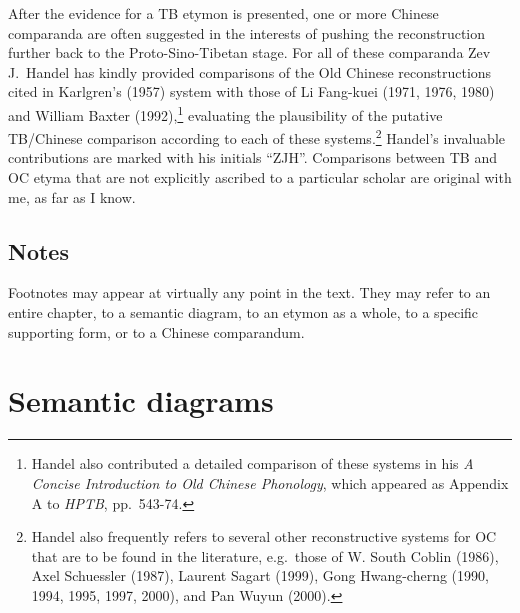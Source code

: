 After the evidence for a TB etymon is presented, one or more Chinese
comparanda are often suggested in the interests of pushing the reconstruction
further back to the Proto-Sino-Tibetan stage.  For all of these comparanda
Zev J.\ Handel has kindly provided comparisons of the Old Chinese reconstructions cited
in Karlgren’s (1957) system with those of Li Fang-kuei (1971, 1976, 1980) and
William Baxter (1992),\footnote{Handel also contributed a detailed comparison
of these systems in his \textit{A Concise Introduction to Old Chinese Phonology},
which appeared as Appendix A to \textit{HPTB}, pp.~543-74.}
evaluating the plausibility of the
putative TB/Chinese comparison according to each of these systems.\footnote{Handel  also frequently refers to several other reconstructive systems for OC that are to be found
in the literature, e.g.\ those of W. South Coblin (1986), Axel Schuessler (1987),
Laurent Sagart (1999), Gong Hwang-cherng (1990, 1994, 1995, 1997, 2000), and Pan
Wuyun (2000).}   Handel’s invaluable contributions are marked with his initials “ZJH”. 
Comparisons between TB and OC etyma that are not explicitly ascribed to a
particular scholar are original with me, as far as I know.

\subsection{Notes}

Footnotes may appear at virtually any point in the text. They may refer to an entire chapter, to a semantic diagram, to an etymon as a whole, to a specific supporting form, or to a Chinese comparandum.

\section{Semantic diagrams}
